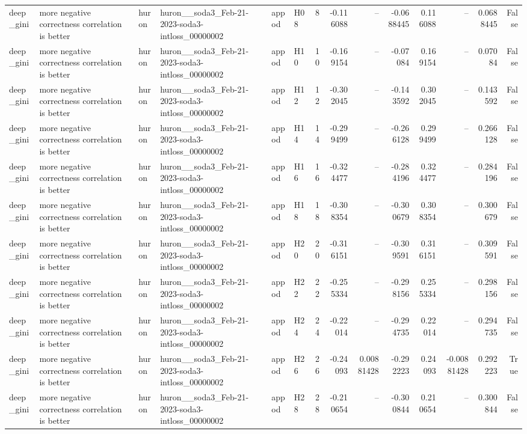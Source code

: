 \begin{longtable}{llllllrrrrrrrr}
deep\_gini & more negative correctness correlation is better & huron & huron\_\_soda3\_Feb-21-2023-soda3-intloss\_00000002 & appod & H08 & 8 & -0.116088 & -- & -0.0688445 & 0.116088 & -- & 0.0688445 & False \\
deep\_gini & more negative correctness correlation is better & huron & huron\_\_soda3\_Feb-21-2023-soda3-intloss\_00000002 & appod & H10 & 10 & -0.169154 & -- & -0.07084 & 0.169154 & -- & 0.07084 & False \\
deep\_gini & more negative correctness correlation is better & huron & huron\_\_soda3\_Feb-21-2023-soda3-intloss\_00000002 & appod & H12 & 12 & -0.302045 & -- & -0.143592 & 0.302045 & -- & 0.143592 & False \\
deep\_gini & more negative correctness correlation is better & huron & huron\_\_soda3\_Feb-21-2023-soda3-intloss\_00000002 & appod & H14 & 14 & -0.299499 & -- & -0.266128 & 0.299499 & -- & 0.266128 & False \\
deep\_gini & more negative correctness correlation is better & huron & huron\_\_soda3\_Feb-21-2023-soda3-intloss\_00000002 & appod & H16 & 16 & -0.324477 & -- & -0.284196 & 0.324477 & -- & 0.284196 & False \\
deep\_gini & more negative correctness correlation is better & huron & huron\_\_soda3\_Feb-21-2023-soda3-intloss\_00000002 & appod & H18 & 18 & -0.308354 & -- & -0.300679 & 0.308354 & -- & 0.300679 & False \\
deep\_gini & more negative correctness correlation is better & huron & huron\_\_soda3\_Feb-21-2023-soda3-intloss\_00000002 & appod & H20 & 20 & -0.316151 & -- & -0.309591 & 0.316151 & -- & 0.309591 & False \\
deep\_gini & more negative correctness correlation is better & huron & huron\_\_soda3\_Feb-21-2023-soda3-intloss\_00000002 & appod & H22 & 22 & -0.255334 & -- & -0.298156 & 0.255334 & -- & 0.298156 & False \\
deep\_gini & more negative correctness correlation is better & huron & huron\_\_soda3\_Feb-21-2023-soda3-intloss\_00000002 & appod & H24 & 24 & -0.22014 & -- & -0.294735 & 0.22014 & -- & 0.294735 & False \\
deep\_gini & more negative correctness correlation is better & huron & huron\_\_soda3\_Feb-21-2023-soda3-intloss\_00000002 & appod & H26 & 26 & -0.24093 & 0.00881428 & -0.292223 & 0.24093 & -0.00881428 & 0.292223 & True \\
deep\_gini & more negative correctness correlation is better & huron & huron\_\_soda3\_Feb-21-2023-soda3-intloss\_00000002 & appod & H28 & 28 & -0.210654 & -- & -0.300844 & 0.210654 & -- & 0.300844 & False \\

\end{longtable}
